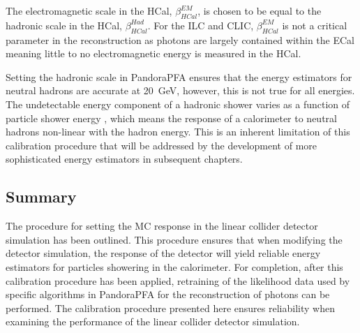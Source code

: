 The electromagnetic scale in the HCal, $\beta^{EM}_{HCal}$, is chosen to be equal to the hadronic scale in the HCal, $\beta^{Had}_{HCal}$.  For the ILC and CLIC, $\beta^{EM}_{HCal}$ is not a critical parameter in the reconstruction as photons are largely contained within the ECal meaning little to no electromagnetic energy is measured in the HCal.  

Setting the hadronic scale in PandoraPFA ensures that the energy estimators for neutral hadrons are accurate at 20~GeV, however, this is not true for all energies.  The undetectable energy component of a hadronic shower varies as a function of particle shower energy \cite{Wigmans:2000vf}, which means the response of a calorimeter to neutral hadrons non-linear with the hadron energy.  This is an inherent limitation of this calibration procedure that will be addressed by the development of more sophisticated energy estimators in subsequent chapters.  


\subsection{Summary}
The procedure for setting the MC response in the linear collider detector simulation has been outlined.  This procedure ensures that when modifying the detector simulation, the response of the detector will yield reliable energy estimators for particles showering in the calorimeter.  For completion, after this calibration procedure has been applied, retraining of the likelihood data used by specific algorithms in PandoraPFA for the reconstruction of photons can be performed.  The calibration procedure presented here ensures reliability when examining the performance of the linear collider detector simulation.  


